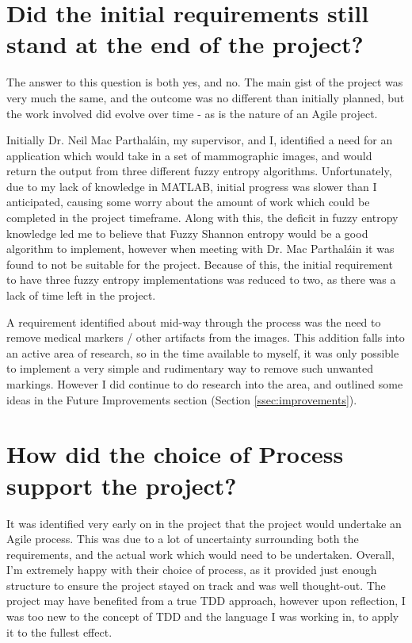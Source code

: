 \section{Did the initial requirements still stand at the end of the project?}

The answer to this question is both yes, and no. The main gist of the project was very much the same, and the outcome was no different than initially planned, but the work involved did evolve over time - as is the nature of an Agile project.

Initially Dr. Neil Mac Parthal\'ain, my supervisor, and I, identified a need for an application which would take in a set of mammographic images, and would return the output from three different fuzzy entropy algorithms. Unfortunately, due to my lack of knowledge in MATLAB, initial progress was slower than I anticipated, causing some worry about the amount of work which could be completed in the project timeframe. Along with this, the deficit in fuzzy entropy knowledge led me to believe that Fuzzy Shannon entropy would be a good algorithm to implement, however when meeting with Dr. Mac Parthal\'ain it was found to not be suitable for the project. Because of this, the initial requirement to have three fuzzy entropy implementations was reduced to two, as there was a lack of time left in the project.

A requirement identified about mid-way through the process was the need to remove medical markers / other artifacts from the images. This addition falls into an active area of research, so in the time available to myself, it was only possible to implement a very simple and rudimentary way to remove such unwanted markings. However I did continue to do research into the area, and outlined some ideas in the Future Improvements section (Section \ref{ssec:improvements}).

\section{How did the choice of Process support the project?}

It was identified very early on in the project that the project would undertake an Agile process. This was due to a lot of uncertainty surrounding both the requirements, and the actual work which would need to be undertaken. Overall, I'm extremely happy with their choice of process, as it provided just enough structure to ensure the project stayed on track and was well thought-out. The project may have benefited from a true \acrshort{TDD} approach, however upon reflection, I was too new to the concept of \acrshort{TDD} and the language I was working in, to apply it to the fullest effect.

